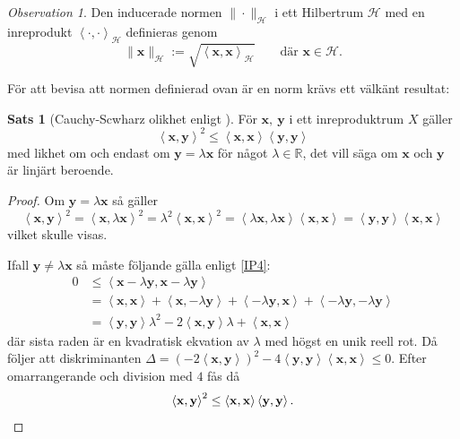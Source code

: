 \documentclass[a4paper, 12pt]{report}
\theoremstyle{definition}
\newtheorem{thm}{Sats}[section]
\theoremstyle{remark}
\newtheorem*{rem}{Observation}
\newcommand{\bfx}{\mathbf{x}}
\newcommand{\llangle}{\left\langle}
\newcommand{\rrangle}{\right\rangle}
\begin{document}
\begin{rem}
	Den inducerade normen $\|\cdot\|_\mathcal{H}$ i ett Hilbertrum $\mathcal{H}$ med en inreprodukt $\llangle \cdot, \cdot\rrangle_\mathcal{H}$ definieras genom
	\begin{equation*}
		\| \mathbf{x}\|_\mathcal{H} := \sqrt{\llangle \bfx, \bfx \rrangle_\mathcal{H}} \qquad \text{där } \bfx \in \mathcal{H}.
	\end{equation*}
\end{rem}
För att bevisa att normen definierad ovan är en norm krävs ett välkänt resultat:
\begin{thm}[Cauchy-Scwharz olikhet enligt \cite{Young}]\label{CauchySchwarz}
	För $\bfx,~\mathbf{y}$ i ett inreproduktrum $X$ gäller
	\begin{equation*}
	\llangle\bfx, \mathbf{y}\rrangle^2 \leq \llangle\bfx, \bfx \rrangle \llangle \mathbf{y}, \mathbf{y} \rrangle
	\end{equation*}
	med likhet om och endast om $\mathbf{y} = \lambda \bfx$ för något $\lambda \in \mathbb{R}$, det vill säga om $\bfx$ och $\mathbf{y}$ är linjärt beroende.
\end{thm}
\begin{proof}
	Om $\mathbf{y} = \lambda \bfx$ så gäller
	\begin{equation*}
	\llangle\bfx, \mathbf{y}\rrangle^2 = \llangle\bfx, \lambda \bfx\rrangle^2 = \lambda^2\llangle\bfx, \bfx\rrangle^2 = \llangle \lambda\bfx, \lambda\bfx \rrangle\llangle \bfx, \bfx \rrangle = \llangle \mathbf{y}, \mathbf{y} \rrangle\llangle \bfx, \bfx \rrangle
	\end{equation*}
	vilket skulle visas.
	
	Ifall $\mathbf{y} \neq \lambda \bfx$ så måste följande gälla enligt \ref{IP4}:
	\begin{align*}
	0 &\leq\llangle \bfx - \lambda\mathbf{y} , \bfx - \lambda\mathbf{y} \rrangle\\
	&= \llangle \bfx, \bfx \rrangle + \llangle \bfx , - \lambda \mathbf{y} \rrangle + \llangle - \lambda \mathbf{y} , \bfx \rrangle + \llangle -\lambda\mathbf{y}, -\lambda\mathbf{y}\rrangle\\
	&=  \llangle\mathbf{y}, \mathbf{y} \rrangle \lambda^2 - 2 \llangle \bfx, \mathbf{y}\rrangle \lambda + \llangle \bfx, \bfx \rrangle
	\end{align*}
	där sista raden är en kvadratisk ekvation av $\lambda$ med högst en unik reell rot. Då följer att diskriminanten $\Delta=\left(-2\llangle\bfx,\mathbf{y}\rrangle\right)^2 - 4 \llangle \mathbf{y}, \mathbf{y}\rrangle\llangle\bfx,\bfx\rrangle\leq0$. Efter omarrangerande och division med $4$ fås då
	\begin{equation*}
	\llangle \bfx, \mathbf{y}\rrangle^2 \leq \llangle \bfx, \bfx \rrangle \llangle \mathbf{y}, \mathbf{y} \rrangle. \qedhere
	\end{equation*}
\end{proof}
\end{document}

